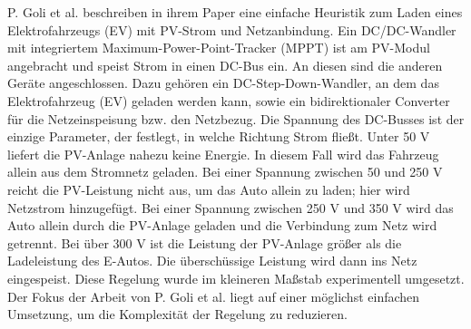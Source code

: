 P. Goli et al. beschreiben in ihrem Paper eine einfache Heuristik zum Laden eines Elektrofahrzeugs (EV) mit PV-Strom und Netzanbindung. Ein DC/DC-Wandler mit integriertem Maximum-Power-Point-Tracker (MPPT) ist am PV-Modul angebracht und speist Strom in einen DC-Bus ein. An diesen sind die anderen Geräte angeschlossen. Dazu gehören ein DC-Step-Down-Wandler, an dem das Elektrofahrzeug (EV) geladen werden kann, sowie ein bidirektionaler Converter für die Netzeinspeisung bzw. den Netzbezug. Die Spannung des DC-Busses ist der einzige Parameter, der festlegt, in welche Richtung Strom fließt. Unter 50 V liefert die PV-Anlage nahezu keine Energie. In diesem Fall wird das Fahrzeug allein aus dem Stromnetz geladen. Bei einer Spannung zwischen 50 und 250 V reicht die PV-Leistung nicht aus, um das Auto allein zu laden; hier wird Netzstrom hinzugefügt. Bei einer Spannung zwischen 250 V und 350 V wird das Auto allein durch die PV-Anlage geladen und die Verbindung zum Netz wird getrennt. Bei über 300 V ist die Leistung der PV-Anlage größer als die Ladeleistung des E-Autos. Die überschüssige Leistung wird dann ins Netz eingespeist. Diese Regelung wurde im kleineren Maßstab experimentell umgesetzt. Der Fokus der Arbeit von P. Goli et al. liegt auf einer möglichst einfachen Umsetzung, um die Komplexität der Regelung zu reduzieren.\cite{goli_pv_2014} 


